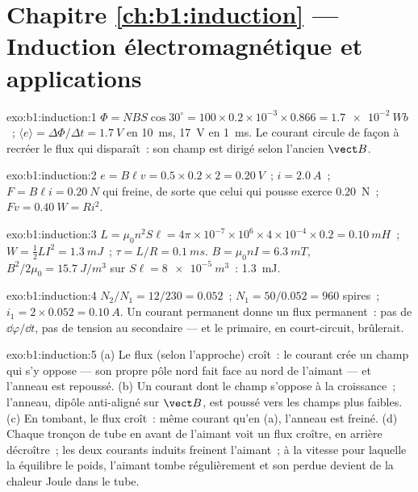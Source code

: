 \section*{Chapitre \ref{ch:b1:induction} --- Induction électromagnétique et applications}

\begin{solution}{exo:b1:induction:1}
$\Phi = NBS\cos30^\circ = 100 \times 0.2 \times 10^{-3} \times 0.866 = \qty{1.7e-2}{Wb}$~;
$\langle e\rangle = \Delta\Phi/\Delta t = \qty{1.7}{V}$ en \qty{10}{ms}, \qty{17}{V} en
\qty{1}{ms}. Le courant circule de façon à recréer le flux qui disparaît~: son
champ est dirigé selon l'ancien $\vect B$.
\end{solution}

\begin{solution}{exo:b1:induction:2}
$e = B\ell v = 0.5 \times 0.2 \times 2 = \qty{0.20}{V}$~; $i = \qty{2.0}{A}$~; $F = B\ell i =
\qty{0.20}{N}$ qui freine, de sorte que celui qui pousse exerce \qty{0.20}{N}~; $Fv = \qty{0.40}{W}
= Ri^2$.
\end{solution}

\begin{solution}{exo:b1:induction:3}
$L = \mu_0n^2S\ell = 4\pi \times 10^{-7} \times 10^6 \times 4 \times 10^{-4} \times 0.2 =
\qty{0.10}{mH}$~; $W = \tfrac12LI^2 = \qty{1.3}{mJ}$~; $\tau = L/R = \qty{0.1}{ms}$.
$B = \mu_0nI = \qty{6.3}{mT}$, $B^2/2\mu_0 = \qty{15.7}{J/m^3}$ sur
$S\ell = \qty{8e-5}{m^3}$~: \qty{1.3}{mJ}.
\end{solution}

\begin{solution}{exo:b1:induction:4}
$N_2/N_1 = 12/230 = 0.052$~; $N_1 = 50/0.052 = 960$ spires~; $i_1 = 2 \times 0.052 =
\qty{0.10}{A}$. Un courant permanent donne un flux permanent~: pas de $\dd\varphi/\dd t$, pas de
tension au secondaire --- et le primaire, en court-circuit, brûlerait.
\end{solution}

\begin{solution}{exo:b1:induction:5}
(a) Le flux (selon l'approche) croît~: le courant crée un champ qui s'y
oppose --- son propre pôle nord fait face au nord de l'aimant --- et l'anneau
est repoussé. (b) Un courant dont le champ s'oppose à la croissance~; l'anneau,
dipôle anti-aligné sur $\vect B$, est poussé vers les champs plus
faibles. (c) En tombant, le flux croît~: même courant qu'en (a), l'anneau est
freiné. (d) Chaque tronçon de tube en avant de l'aimant voit un flux croître,
en arrière décroître~; les deux courants induits freinent l'aimant~; à la
vitesse pour laquelle la  équilibre le poids, l'aimant tombe
régulièrement et son  perdue devient de la chaleur Joule
dans le tube.
\end{solution}

